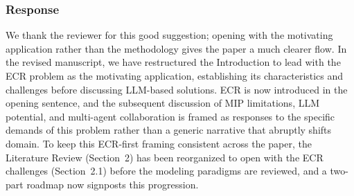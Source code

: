 \documentclass[11pt,a4paper]{article}
\begin{document}
\subsubsection{Response}
We thank the reviewer for this good suggestion; opening with the motivating application rather than the methodology gives the paper a much clearer flow. In the revised manuscript, we have restructured the Introduction to lead with the ECR problem as the motivating application, establishing its characteristics and challenges before discussing LLM-based solutions. ECR is now introduced in the opening sentence, and the subsequent discussion of MIP limitations, LLM potential, and multi-agent collaboration is framed as responses to the specific demands of this problem rather than a generic narrative that abruptly shifts domain. To keep this ECR-first framing consistent across the paper, the Literature Review (Section~2) has been reorganized to open with the ECR challenges (Section~2.1) before the modeling paradigms are reviewed, and a two-part roadmap now signposts this progression.
\end{document}
